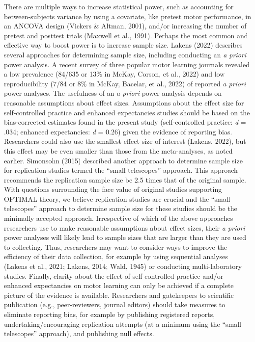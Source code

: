 \documentclass[
  man, donotrepeattitle,floatsintext]{apa7}
\begin{document}
There are multiple ways to increase statistical power, such as accounting for between-subjects variance by using a covariate, like pretest motor performance, in an ANCOVA design (Vickers \& Altman, 2001), and/or increasing the number of pretest and posttest trials (Maxwell et al., 1991). Perhaps the most common and effective way to boost power is to increase sample size. Lakens (2022) describes several approaches for determining sample size, including conducting an \emph{a priori} power analysis. A recent survey of three popular motor learning journals revealed a low prevalence (84/635 or 13\% in McKay, Corson, et al., 2022) and low reproducibility (7/84 or 8\% in McKay, Bacelar, et al., 2022) of reported \emph{a priori} power analyses. The usefulness of an \emph{a priori} power analysis depends on reasonable assumptions about effect sizes. Assumptions about the effect size for self-controlled practice and enhanced expectancies studies should be based on the bias-corrected estimates found in the present study (self-controlled practice: \emph{d} = .034; enhanced expectancies: \emph{d} = 0.26) given the evidence of reporting bias. Researchers could also use the smallest effect size of interest (Lakens, 2022), but this effect may be even smaller than those from the meta-analyses, as noted earlier. Simonsohn (2015) described another approach to determine sample size for replication studies termed the ``small telescopes'' approach. This approach recommends the replication sample size be 2.5 times that of the original sample. With questions surrounding the face value of original studies supporting OPTIMAL theory, we believe replication studies are crucial and the ``small telescopes'' approach to determine sample size for these studies should be the minimally accepted approach. Irrespective of which of the above approaches researchers use to make reasonable assumptions about effect sizes, their \emph{a priori} power analyses will likely lead to sample sizes that are larger than they are used to collecting. Thus, researchers may want to consider ways to improve the efficiency of their data collection, for example by using sequential analyses (Lakens et al., 2021; Lakens, 2014; Wald, 1945) or conducting multi-laboratory studies. Finally, clarity about the effect of self-controlled practice and/or enhanced expectancies on motor learning can only be achieved if a complete picture of the evidence is available. Researchers and gatekeepers to scientific publication (e.g., peer-reviewers, journal editors) should take measures to eliminate reporting bias, for example by publishing registered reports, undertaking/encouraging replication attempts (at a minimum using the ``small telescopes'' approach), and publishing null effects.
\end{document}
